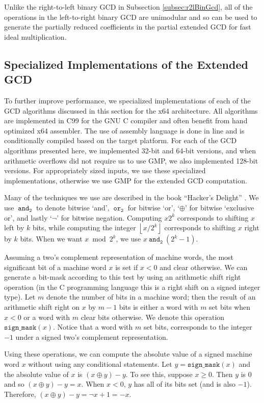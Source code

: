 \documentclass{ucalgthes1}
\theoremstyle{definition}
\newcommand{\floor}[1]{\left\lfloor #1 \right\rfloor}
\newcommand{\band}{~\texttt{and}_\texttt{2}~}
\newcommand{\bor}{~\texttt{or}_\texttt{2}~}
\newcommand{\bxor}{\oplus}
\newcommand{\bnot}{\lnot}
\begin{document}
Unlike the right-to-left binary GCD in Subsection \ref{subsec:r2lBinGcd}, all of the operations in the left-to-right binary GCD are unimodular and so can be used to generate the partially reduced coefficients in the partial extended GCD for fast ideal multiplication.


\subsection{Specialized Implementations of the Extended GCD}
\label{subsec:gcdImpl}

To further improve performance, we specialized implementations of each of the GCD algorithms discussed in this section for the x64 architecture.  All algorithms are implemented in C99 for the GNU C compiler and often benefit from hand optimized x64 assembler.  The use of assembly language is done in line and is conditionally compiled based on the target platform.  For each of the GCD algorithms presented here, we implemented 32-bit and 64-bit versions, and when arithmetic overflows did not require us to use GMP, we also implemented 128-bit versions.  For appropriately sized inputs, we use these specialized implementations, otherwise we use GMP for the extended GCD computation.

Many of the techniques we use are described in the book ``Hacker's Delight'' \cite{Warren2002}.  We use $\band$ to denote bitwise `and', $\bor$ for bitwise `or', `$\bxor$' for bitwise `exclusive or', and lastly `$\bnot$' for bitwise negation.  Computing $x2^k$ corresponds to shifting $x$ left by $k$ bits, while computing the integer $\floor{x / 2^k}$ corresponds to shifting $x$ right by $k$ bits.  When we want $x \bmod 2^k$, we use $x \band (2^k-1)$.

Assuming a two's complement representation of machine words, the most significant bit of a machine word $x$ is set if $x < 0$ and clear otherwise.  We can generate a bit-mask according to this test by using an arithmetic shift right operation (in the C programming language this is a right shift on a signed integer type).  Let $m$ denote the number of bits in a machine word; then the result of an arithmetic shift right on $x$ by $m-1$ bits is either a word with $m$ set bits when $x < 0$ or a word with $m$ clear bits otherwise.  We denote this operation $\texttt{sign\_mask}(x)$.  Notice that a word with $m$ set bits, corresponds to the integer $-1$ under a signed two's complement representation.

Using these operations, we can compute the absolute value of a signed machine word $x$ without using any conditional statements.  Let $y = \texttt{sign\_mask}(x)$ and the absolute value of $x$ is $(x \bxor y) - y$.  To see this, suppose $x \ge 0$.  Then $y$ is 0 and so $(x \bxor y) - y = x$.  When $x < 0$, $y$ has all of its bits set (and is also $-1$).  Therefore, $(x \bxor y) - y = \bnot x + 1 = -x$.
\end{document}
